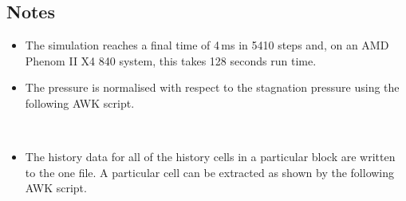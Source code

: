 \newpage
\subsection{Notes}
\begin{itemize}
\item The simulation reaches a final time of 4\,ms in 5410 steps and,
      on an AMD Phenom II X4 840 system, this takes 128 seconds run time.
\item The pressure is normalised with respect to the stagnation pressure
      using the following AWK script.\\
      \topbarshort
      
      \bottombarshort\\
\item The history data for all of the history cells in a particular block are
      written to the one file.
      A particular cell can be extracted as shown by the following AWK script.\\
      \topbarshort
      
      \bottombarshort\\
\end{itemize}
